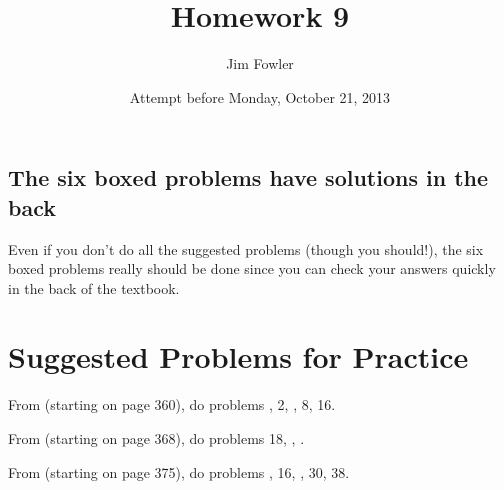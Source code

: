 \documentclass[12pt]{handout}
\title{Homework 9}
\date{Attempt before Monday, October 21, 2013}
\author{Jim Fowler}
\begin{document}
\maketitle










\subsection*{The six boxed problems have solutions in the back}
Even if you don't do all the suggested problems (though you should!), the six boxed problems really should be done since you can check your answers quickly in the back of the textbook.

\section*{Suggested Problems for Practice}

From  (starting on page 360),
do problems , 2, , 8, 16.
\vspace{1ex}

From  (starting on page 368),
do problems 18, , .
\vspace{1ex}

From  (starting on page 375),
do problems , 16, , 30, 38.
\vspace{1ex}
\end{document}
